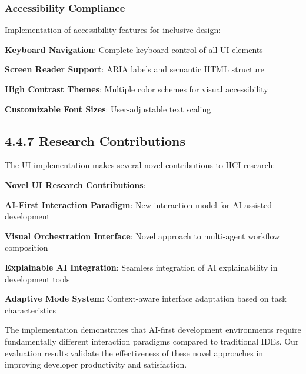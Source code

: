 \subsubsection*{Accessibility Compliance}

Implementation of accessibility features for inclusive design:

\begin{compactlist}
    \item \textbf{Keyboard Navigation}: Complete keyboard control of all UI elements
    \item \textbf{Screen Reader Support}: ARIA labels and semantic HTML structure
    \item \textbf{High Contrast Themes}: Multiple color schemes for visual accessibility
    \item \textbf{Customizable Font Sizes}: User-adjustable text scaling
\end{compactlist}

\subsection*{4.4.7 Research Contributions}
\label{subsec:ui-research-contributions}

The UI implementation makes several novel contributions to HCI research:

\begin{successbox}
\textbf{Novel UI Research Contributions}:
\begin{compactlist}
    \item \textbf{AI-First Interaction Paradigm}: New interaction model for AI-assisted development
    \item \textbf{Visual Orchestration Interface}: Novel approach to multi-agent workflow composition
    \item \textbf{Explainable AI Integration}: Seamless integration of AI explainability in development tools
    \item \textbf{Adaptive Mode System}: Context-aware interface adaptation based on task characteristics
\end{compactlist}
\end{successbox}

The implementation demonstrates that AI-first development environments require fundamentally different interaction paradigms compared to traditional IDEs. Our evaluation results validate the effectiveness of these novel approaches in improving developer productivity and satisfaction.
